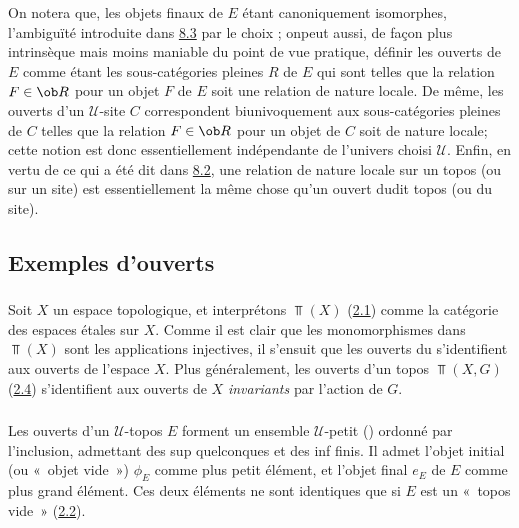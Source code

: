 \documentclass[10pt]{../fichiers-configuration-latex/smfart}
\begin{document}
On notera que, les objets finaux de $E$ étant canoniquement
isomorphes, l'ambiguïté introduite dans \hyperref[IV.def8.3]{8.3} par le choix
; on\pageoriginale peut aussi, de façon plus
intrinsèque mais moins maniable du point de vue pratique, définir
les ouverts de $E$ comme étant les sous-catégories pleines $R$ de
$E$ qui sont telles que la relation $F\in \ob R$ pour un objet $F$
de $E$ soit une relation de nature locale. De même, les ouverts d'un
$𝒰$-site $C$ correspondent biunivoquement aux
sous-catégories pleines de $C$ telles que la relation $F\in \ob R$
pour un objet de $C$ soit de nature locale; cette notion est donc
essentiellement indépendante de l'univers choisi $𝒰$. Enfin,
en vertu de ce qui a été dit dans \hyperref[IV.subsec8.2]{8.2}, une relation
de nature locale sur un topos (ou sur un site) est essentiellement
la même chose qu'un ouvert dudit topos (ou du site).

\setcounter{subsection}{3}
\subsection{Exemples d'ouverts}

\subsubsection{}
Soit $X$ un espace topologique, et interprétons $\Top(X)$
(\hyperref[IV.subsec2.1]{2.1}) comme la catégorie des espaces étales sur $X$.
Comme il est clair que les monomorphismes dans $\Top(X)$ sont les
applications injectives, il s'ensuit que les ouverts du 
s'identifient aux ouverts de l'espace $X$. Plus généralement, les
ouverts d'un topos $\Top(X,G)$ (\hyperref[IV.subsec2.4]{2.4}) s'identifient
aux ouverts de $X$ \emph{invariants} par l'action de $G$.

\subsubsection{}
Les ouverts d'un $𝒰$-topos $E$ forment un ensemble
$𝒰$-petit () ordonné par l'inclusion,
admettant des sup quelconques et des inf finis. Il admet l'objet
initial (ou « objet vide ») $\phi_E$ comme plus petit élément,
et l'objet final $e_E$ de $E$ comme plus grand élément. Ces deux
éléments ne sont identiques que si $E$ est un « topos vide »
(\hyperref[IV.subsec2.2]{2.2}).
\end{document}
